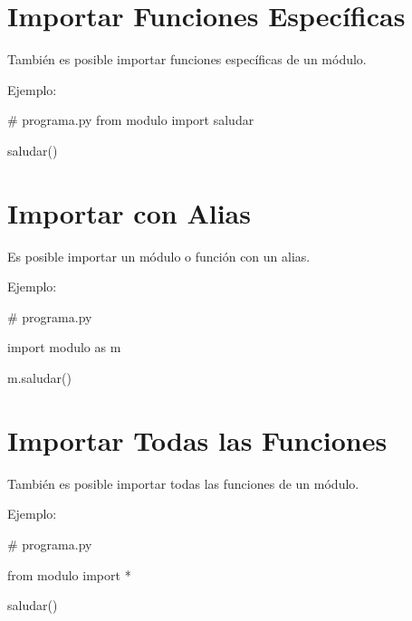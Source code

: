 \documentclass[
  a4paper,
  DIV=11,
  numbers=noendperiod,
  onepage,
  openany]{scrreprt}
\newenvironment{Shaded}{\begin{snugshade}}{\end{snugshade}}
\newcommand{\CommentTok}[1]{\textcolor[rgb]{0.37,0.37,0.37}{#1}}
\newcommand{\ImportTok}[1]{\textcolor[rgb]{0.00,0.46,0.62}{#1}}
\newcommand{\NormalTok}[1]{\textcolor[rgb]{0.00,0.23,0.31}{#1}}
\newcommand{\OperatorTok}[1]{\textcolor[rgb]{0.37,0.37,0.37}{#1}}
\begin{document}
\section{Importar Funciones
Específicas}\label{importar-funciones-especuxedficas}

También es posible importar funciones específicas de un módulo.

Ejemplo:

\begin{Shaded}
\begin{Highlighting}[]
\CommentTok{\# programa.py}
\ImportTok{from}\NormalTok{ modulo }\ImportTok{import}\NormalTok{ saludar}

\NormalTok{saludar()}
\end{Highlighting}
\end{Shaded}

\section{Importar con Alias}\label{importar-con-alias}

Es posible importar un módulo o función con un alias.

Ejemplo:

\begin{Shaded}
\begin{Highlighting}[]
\CommentTok{\# programa.py}

\ImportTok{import}\NormalTok{ modulo }\ImportTok{as}\NormalTok{ m}

\NormalTok{m.saludar()}
\end{Highlighting}
\end{Shaded}

\section{Importar Todas las
Funciones}\label{importar-todas-las-funciones}

También es posible importar todas las funciones de un módulo.

Ejemplo:

\begin{Shaded}
\begin{Highlighting}[]
\CommentTok{\# programa.py}

\ImportTok{from}\NormalTok{ modulo }\ImportTok{import} \OperatorTok{*}

\NormalTok{saludar()}
\end{Highlighting}
\end{Shaded}
\end{document}
